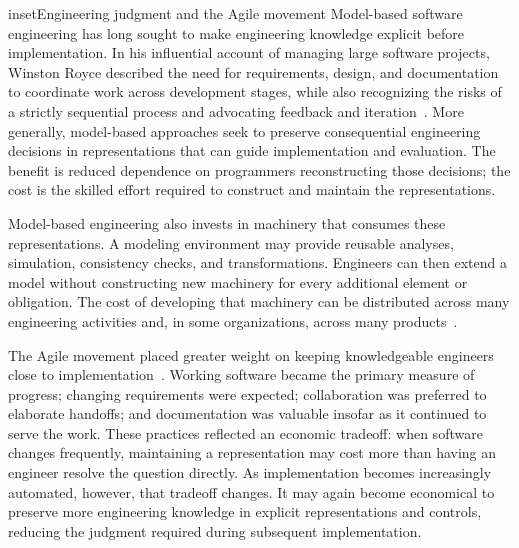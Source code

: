 \begin{bookbox}{inset}{Engineering judgment and the Agile movement}
\label{inset-engineering-judgment-agile}
Model-based software engineering has long sought to make engineering knowledge explicit before implementation. In his influential account of managing large software projects, Winston Royce described the need for requirements, design, and documentation to coordinate work across development stages, while also recognizing the risks of a strictly sequential process and advocating feedback and iteration~\citep{royce1970}. More generally, model-based approaches seek to preserve consequential engineering decisions in representations that can guide implementation and evaluation. The benefit is reduced dependence on programmers reconstructing those decisions; the cost is the skilled effort required to construct and maintain the representations.

Model-based engineering also invests in machinery that consumes these representations. A modeling environment may provide reusable analyses, simulation, consistency checks, and transformations. Engineers can then extend a model without constructing new machinery for every additional element or obligation. The cost of developing that machinery can be distributed across many engineering activities and, in some organizations, across many products~\citep{schmidt2006model,kelly2008domain}.

The Agile movement placed greater weight on keeping knowledgeable engineers close to implementation~\citep{agile-manifesto2001,scrumguide2020}. Working software became the primary measure of progress; changing requirements were expected; collaboration was preferred to elaborate handoffs; and documentation was valuable insofar as it continued to serve the work. These practices reflected an economic tradeoff: when software changes frequently, maintaining a representation may cost more than having an engineer resolve the question directly. As implementation becomes increasingly automated, however, that tradeoff changes. It may again become economical to preserve more engineering knowledge in explicit representations and controls, reducing the judgment required during subsequent implementation.
\end{bookbox}

